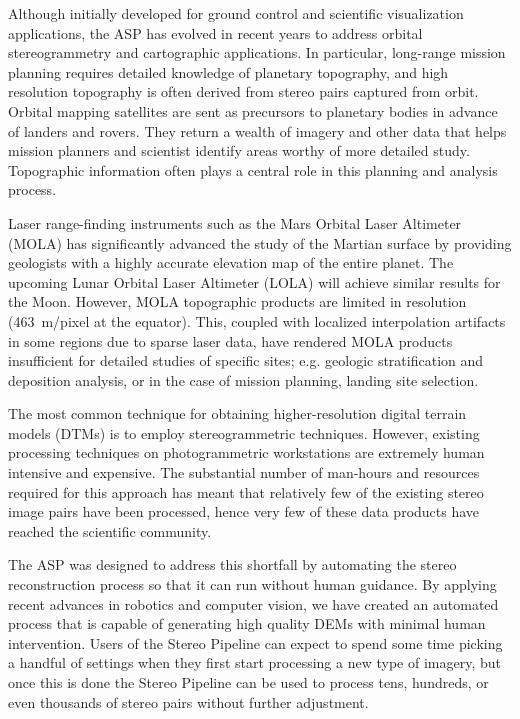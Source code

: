 Although initially developed for ground control and scientific
visualization applications, the ASP has evolved in recent years to
address orbital stereogrammetry and cartographic applications.  In
particular, long-range mission planning requires detailed knowledge of
planetary topography, and high resolution topography is often derived
from stereo pairs captured from orbit.  Orbital mapping satellites are
sent as precursors to planetary bodies in advance of landers and
rovers.  They return a wealth of imagery and other data that helps
mission planners and scientist identify areas worthy of more detailed
study. Topographic information often plays a central role in this
planning and analysis process.

Laser range-finding instruments such as the Mars Orbital Laser
Altimeter (MOLA) \citep{1992JGR....97.7781Z,2001JGR...10623689S}
has significantly advanced the study of the Martian surface by
providing geologists with a highly accurate elevation map of the
entire planet.  The upcoming Lunar Orbital Laser Altimeter (LOLA)
\citep{2008AGUFM.P31B1419N,2007SSRv..129..391C} will achieve similar
results for the Moon.  However, MOLA topographic products are limited
in resolution (463~m/pixel at the equator).  This, coupled with
localized interpolation artifacts in some regions due to sparse
laser data, have rendered MOLA products insufficient for detailed
studies of specific sites; e.g. geologic stratification and deposition
analysis, or in the case of mission planning, landing site selection.

The most common technique for obtaining higher-resolution digital
terrain models (DTMs) is to employ stereogrammetric techniques.
However, existing processing techniques on photogrammetric
workstations are extremely human intensive and expensive.  The
substantial number of man-hours and resources required for this
approach has meant that relatively few of the existing stereo image
pairs have been processed, hence very few of these data products have
reached the scientific community.

The ASP was designed to address this shortfall by automating the
stereo reconstruction process so that it can run without human
guidance.  By applying recent advances in robotics and computer
vision, we have created an automated process that is capable of
generating high quality DEMs with minimal human intervention.  Users
of the Stereo Pipeline can expect to spend some time picking a handful
of settings when they first start processing a new type of imagery,
but once this is done the Stereo Pipeline can be used to process tens,
hundreds, or even thousands of stereo pairs without further
adjustment.


